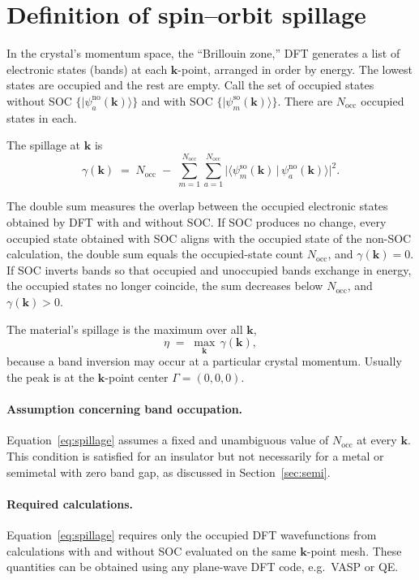 \documentclass[11pt]{article}
\newcommand{\ket}[1]{\lvert #1 \rangle}
\newcommand{\braket}[2]{\langle #1 \,\vert\, #2 \rangle}
\newcommand{\Nocc}{N_{\mathrm{occ}}}
\newcommand{\kk}{\mathbf{k}}
\begin{document}
\section{Definition of spin--orbit spillage}\label{sec:phys}

In the crystal's momentum space, the ``Brillouin zone,'' DFT generates a list of electronic states
(bands) at each $\kk$-point, arranged in order by energy. The lowest states are occupied and the rest
are empty. Call the set of occupied states without SOC $\{\ket{\psi^{\text{no}}_a(\kk)}\}$ and with
SOC $\{\ket{\psi^{\text{so}}_m(\kk)}\}$. There are $\Nocc$ occupied states in each.

The spillage at $\kk$ is
\begin{equation}
  \gamma(\kk) \;=\; \Nocc \;-\; \sum_{m=1}^{\Nocc}\sum_{a=1}^{\Nocc}
  \bigl|\braket{\psi^{\text{so}}_m(\kk)}{\psi^{\text{no}}_a(\kk)}\bigr|^{2}.
  \label{eq:spillage}
\end{equation}

The double sum measures the overlap between the occupied electronic states obtained by DFT with and
without SOC. If SOC produces no change, every occupied state obtained with SOC aligns with the
occupied state of the non-SOC calculation, the double sum equals the occupied-state count $\Nocc$,
and $\gamma(\kk)=0$. If SOC inverts bands so that occupied and unoccupied bands exchange in energy,
the occupied states no longer coincide, the sum decreases below $\Nocc$, and $\gamma(\kk)>0$.

The material's spillage is the maximum over all $\kk$,
\begin{equation}
  \eta \;=\; \max_{\kk}\,\gamma(\kk),
\end{equation}
because a band inversion may occur at a particular crystal momentum.
Usually the peak is at the $\kk$-point center $\Gamma=(0,0,0)$.

\paragraph{Assumption concerning band occupation.} Equation~\eqref{eq:spillage} assumes a fixed and
unambiguous value of $\Nocc$ at every $\kk$. This condition is satisfied for an insulator but not
necessarily for a metal or semimetal with zero band gap, as discussed in Section~\ref{sec:semi}.

\paragraph{Required calculations.} Equation~\eqref{eq:spillage} requires only the occupied DFT
wavefunctions from calculations with and without SOC evaluated on the same $\kk$-point mesh. These
quantities can be obtained using any plane-wave DFT code, e.g.\ VASP or QE.
\end{document}
